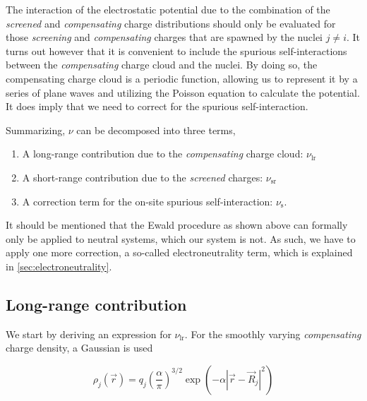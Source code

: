 \begin{Figure}
    \centering
    \resizebox{0.9 \textwidth}{!}{
        
    }
    \label{fig:ewald_schematic}
\end{Figure}

The interaction of the electrostatic potential due to the combination of the \textit{screened} and \textit{compensating} charge distributions should only be evaluated for those \textit{screening} and \textit{compensating} charges that are spawned by the nuclei $j \neq i$. It turns out however that it is convenient to include the spurious self-interactions between the \textit{compensating} charge cloud and the nuclei. By doing so, the compensating charge cloud is a periodic function, allowing us to represent it by a series of plane waves and utilizing the Poisson equation to calculate the potential. It does imply that we need to correct for the spurious self-interaction.

Summarizing, $\nu$ can be decomposed into three terms,

\begin{enumerate}
    \item A long-range contribution due to the \textit{compensating} charge cloud: $\nu_{\text{lr}}$
    \item A short-range contribution due to the \textit{screened} charges: $\nu_{\text{sr}}$
    \item A correction term for the on-site spurious self-interaction: $\nu_{\text{s}}$.
\end{enumerate}

It should be mentioned that the Ewald procedure as shown above can formally only be applied to neutral systems, which our system is not. As such, we have to apply one more correction, a so-called electroneutrality term, which is explained in \cref{sec:electroneutrality}.

%
%
%
\subsection{Long-range contribution}

We start by deriving an expression for $\nu_{\text{lr}}$. For the smoothly varying \textit{compensating} charge density, a Gaussian is used

\begin{equation}
    \rho_{j}(\vec{r}) = q_{j} \left( \frac{\alpha}{\pi} \right)^{3/2} \exp \left(- \alpha \left|\vec{r} - \vec{R}_{j} \right|^{2} \right)
    \label{eq:gaussian}
\end{equation}

